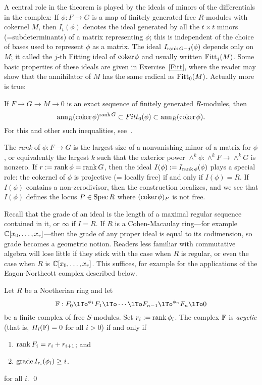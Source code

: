 A central role in the theorem is played by the ideals of minors of the differentials in the complex: If $\phi: F\to G$ is a map of finitely generated free $R$-modules with cokernel $M$, then
$I_t(\phi)$ denotes the ideal generated by all the $t\times t$ minors (=subdeterminants) of a matrix representing $\phi$; this is independent of the choice of bases used to represent $\phi$ as a matrix.
The ideal $I_{\operatorname{rank} G -j}(\phi)$ depends only on $M$; it called the $j$-th Fitting ideal of ${\rm{coker}\kern1pt} \phi$  and 
usually written $\operatorname{Fitt}_{j}(M)$. Some basic properties of these ideals are
given in Exercise~\ref{Fitt}, where the reader may show that the annihilator of $M$ has the
same radical as $\operatorname{Fitt}_{0}(M)$. Actually more is true: 

\begin{fact}
If $F\to G \to M \to 0$ is an exact sequence of finitely generated $R$-modules, then 
$$
{\rm{ann}}_{R}({\rm{coker}\kern1pt} \phi)^{\operatorname{rank} G}\subset Fitt_{0}(\phi) \subset {\rm{ann}}_{R}({\rm{coker}\kern1pt} \phi).
$$
For this and other such inequalities, see~\cite{MR476736}.
\end{fact}

The \emph{rank} of $\phi: F\to G$ is the largest size of a nonvanishing minor of a matrix for $\phi$,
or equivalently the largest $k$ such that the exterior power $\wedge^{k}\phi : \wedge^{k}F \to \wedge^{k}G$
is nonzero. If $r:= \operatorname{rank} \phi = \operatorname{rank} G$, then the ideal $I(\phi): = I_{\operatorname{rank} \phi}(\phi)$ plays a special role: the cokernel of $\phi$
is projective (= locally free) if and only if $I(\phi) = R$. If $I(\phi)$ contains a non-zerodivisor, then
the construction localizes, and we see that $I(\phi)$ defines the locus  $P\in \operatorname{Spec} R$ where $({\rm{coker}\kern1pt} \phi)_{P}$
is not free. 


Recall that the grade of an ideal is the length of a maximal regular sequence
contained in it, or $\infty$ if $I=R$. If $R$ is a Cohen-Macaulay ring---for example ${\mathbb C}[x_{0},\dots, x_{r}]$---then the grade of any proper ideal is equal to its codimension, so grade becomes a geometric notion.
Readers less familiar with commutative algebra will lose little if they stick with the case when $R$ is
regular, or even the case when $R$ is ${\mathbb C}[x_{0},\dots, x_{r}]$. This suffices, for example for the applications
of the Eagon-Northcott complex described below.


\begin{theorem}\label{WMACE}
 Let $R$ be a Noetherian ring and let
 $$ 
\FF:  F_0\lTo^{\phi_1}F_1 \lTo \cdots \lTo F_{n-1}\lTo^{\phi_n} F_n\lTo 0
 $$
be a finite complex of free $S$-modules. Set $r_i := \operatorname{rank} \phi_i$. 
The complex ${\mathbb F}$ is \emph{acyclic} (that is, $H_i({\mathbb F}) = 0$ for all $i>0$) if and only if
\begin{enumerate}
 \item $\operatorname{rank} F_i = r_i+r_{i+1}$; and
 \item $\operatorname{grade} I_{r_{i}}(\phi_i) \geq i$.
\end{enumerate}
for all $i$.
\qed
\end{theorem}

